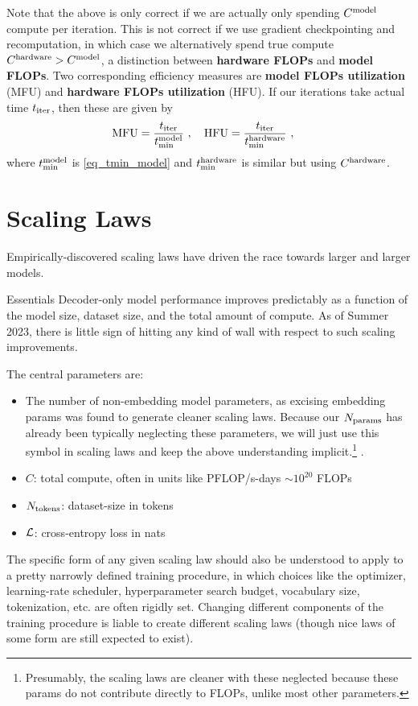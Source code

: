 \documentclass[11pt]{article}
\begin{document}
Note that the above is only correct if we are actually only spending $C  ^{ {\rm  model}  }$
compute per iteration. This is not correct if we use gradient checkpointing and recomputation, in which case
we alternatively spend true compute  $C  ^{ {\rm  hardware}  } > C  ^{ {\rm  model}  } $,
a distinction between \textbf{hardware FLOPs} and \textbf{model FLOPs}. Two corresponding efficiency
measures are \textbf{model FLOPs utilization} (MFU) and \textbf{hardware FLOPs utilization}  (HFU).
If our iterations take actual time $ t _{ {\rm iter} } $, then these are given by
\begin{align}
	{\rm MFU} & = \frac{ t _{ {\rm iter} } }{ t _{ {\rm  min} } ^{ {\rm  model} } } \ , \quad {\rm HFU} = \frac{ t _{ {\rm iter} } }{ t _{ {\rm  min} } ^{ {\rm  hardware} } } \ , \label{eq_mfu}
\end{align}
where $ t _{ {\rm min} } ^{ {\rm  model} } $ is \eqref{eq_tmin_model} and $ t _{ {\rm min} } ^{ {\rm  hardware} } $ is similar but using
$ C  ^{ {\rm  hardware} } $.


\section{Scaling Laws \label{sec_scaling_laws}}


Empirically-discovered scaling laws have driven the race towards larger and larger models.
\begin{nicebox}{Essentials}
	Decoder-only model performance improves predictably as a function of the model size, dataset size,
	and the total amount of compute. As of Summer 2023, there is little sign of hitting any kind of wall
	with respect to such scaling improvements.
\end{nicebox}


The central parameters are:
\begin{itemize}
	\item The number of non-embedding model parameters, as excising embedding params was found to
	      generate cleaner scaling laws. Because our $ N _{ {\rm params} }$ has already been typically
	      neglecting these parameters, we will just use this symbol in scaling laws and keep the above
	      understanding implicit.\footnote{Presumably, the scaling laws are
		      cleaner with these neglected because these params do not contribute directly to
		      FLOPs, unlike most other parameters.} \cite{kaplan2020scaling}.
	\item $ C $: total compute, often in units like PFLOP/s-days $ \sim 10 ^{ 20 } $ FLOPs
	\item $ N _{ {\rm tokens} } $: dataset-size in tokens
	\item $\mathcal{L}$: cross-entropy loss in nats
\end{itemize}
The specific form of any given scaling law should also be understood to apply to a pretty narrowly
defined training procedure, in which choices like the optimizer, learning-rate scheduler,
hyperparameter search budget, vocabulary size, tokenization, etc. are often rigidly set. Changing
different components of the training procedure is liable to create different scaling laws (though
nice laws of some form are still expected to exist).
\end{document}
